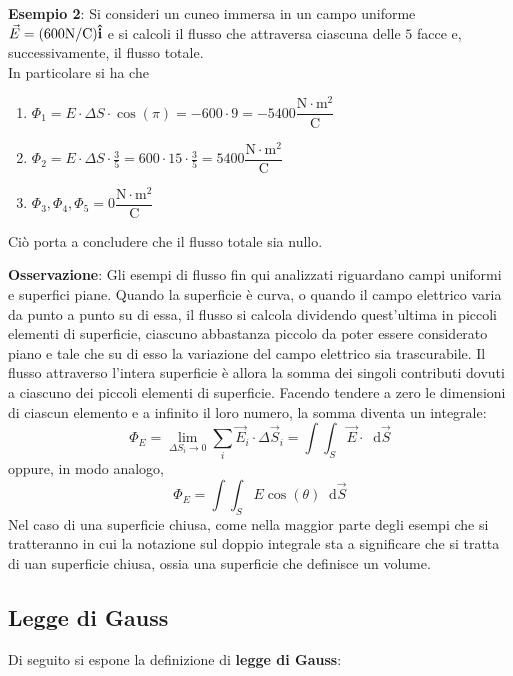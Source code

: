\documentclass[a4paper]{extarticle}
\newcommand*\dif{\mathop{}\!\mathrm{d}}
\begin{document}
\vspace{1em}
\noindent
\textbf{Esempio 2}: Si consideri un cuneo immersa in un campo uniforme $\vec E = (600 \text{N} / \text{C}) \bf{\hat i}$ e si calcoli il flusso che attraversa ciascuna delle $5$ facce e, successivamente, il flusso totale.\\
In particolare si ha che
\begin{enumerate}
  \item $\Phi_1 = E \cdot \Delta S \cdot \cos(\pi) = -600 \cdot 9 = -5400 \dfrac{\text{N} \cdot \text{m}^2}{\text{C}}$
  \item $\Phi_2 = E \cdot \Delta S \cdot \frac{3}{5} = 600 \cdot 15 \cdot \frac{3}{5} = 5400 \dfrac{\text{N} \cdot \text{m}^2}{\text{C}}$
  \item $\Phi_3,\Phi_4,\Phi_5=0\dfrac{\text{N} \cdot \text{m}^2}{\text{C}}$
\end{enumerate}
Ciò porta a concludere che il flusso totale sia nullo.

\vspace{2em}
\noindent
\textbf{Osservazione}: Gli esempi di flusso fin qui analizzati riguardano campi uniformi e superfici piane. Quando la superficie è curva, o quando il campo elettrico varia da punto a punto su di essa, il flusso si calcola dividendo quest'ultima in piccoli elementi di superficie, ciascuno abbastanza piccolo da poter essere considerato piano e tale che su di esso la variazione del campo elettrico sia trascurabile. Il flusso attraverso l'intera superficie è allora la somma dei singoli contributi dovuti a ciascuno dei piccoli elementi di superficie. Facendo tendere a zero le dimensioni di ciascun elemento e a infinito il loro numero, la somma diventa un integrale:
\[\boxed{\Phi_E = \lim_{\Delta S_i \to 0} \sum_i \vec{E}_i \cdot \Delta \vec{S}_i = \int \int_S \vec{E} \cdot \dif \vec{S}}\]
oppure, in modo analogo,
\[\Phi_E = \int \int_S  E \cos(\theta) \dif \vec{S}\]
Nel caso di una superficie chiusa, come nella maggior parte degli esempi che si tratteranno
in cui la notazione sul doppio integrale sta a significare che si tratta di uan superficie chiusa, ossia una superficie che definisce un volume.

\vspace{1em}
\subsection{Legge di Gauss}
Di seguito si espone la definizione di \textbf{legge di Gauss}:
\end{document}
